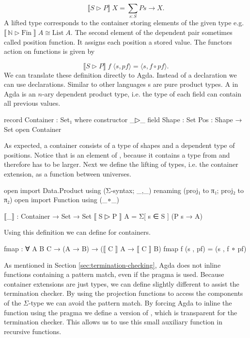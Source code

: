 $$
  \lBrack S \rhd P \rBrack\;X = \sum\limits_{s : S} P s \rightarrow X.
$$
A lifted type corresponds to the container storing elements of the given type
e.g. $\lBrack\, \mathbb{N} \rhd \mathrm{Fin}\;\rBrack \; A \cong
\mathrm{List}\;A$.
The second element of the dependent pair sometimes called position function.
It assigns each position a stored value.
The functors action on functions is given by

$$
  \lBrack S \rhd P \rBrack \;f\;\langle s , pf \rangle = \langle s , f \circ pf \rangle.
$$
We can translate these definition directly to Agda.
Instead of a  declaration we can use 
declarations.
Similar to other languages s are pure product types.
A  in Agda is an $n$-ary dependent product type, i.e. the
type of each field can contain all previous values.

\begin{code}
record Container : Set₁ where
  constructor _▷_
  field
    Shape : Set
    Pos : Shape → Set
open Container
\end{code}
As expected, a container consists of a type of shapes and a dependent type of
positions.
Notice that  is an element of ,
because it contains a type from  and therefore has to be
larger.
Next we define the lifting of types, i.e. the container extension, as a function
between universes.

\begin{code}[hide]
open import Data.Product using (Σ-syntax; _,_) renaming (proj₁ to π₁; proj₂ to π₂)
open import Function using (_∘_)
\end{code}
\begin{code}
⟦_⟧ : Container → Set → Set
⟦ S ▷ P ⟧ A = Σ[ s ∈ S ] (P s → A)
\end{code}
Using this definition we can define  for containers.

\begin{code}
fmap : ∀ {A B C} → (A → B) → (⟦ C ⟧ A → ⟦ C ⟧ B)
fmap f (s , pf) = (s , f ∘ pf)
\end{code}
As mentioned in Section \ref{sec:termination-checking}, Agda does not inline
functions containing a pattern match, even if the  pragma
is used.
Because container extensions are just  types, we can define
 slightly different to assist the termination checker.
By using the projection functions to access the components of the $\Sigma$-type
we can avoid the pattern match.
By forcing Agda to inline the function using the pragma we define a version of
, which is transparent for the termination checker.
This allows us to use this small auxiliary function in recursive functions.

